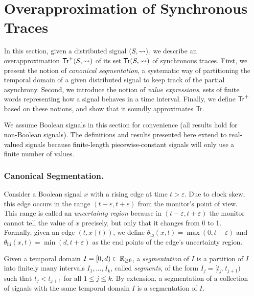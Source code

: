 \section{Overapproximation of Synchronous Traces} \label{sec:approach}
In this section, given a distributed signal $(S,{\rightsquigarrow})$, we describe an overapproximation $\mathsf{Tr}^+(S,{\rightsquigarrow})$ of its set $\mathsf{Tr}(S,{\rightsquigarrow})$ of synchronous traces.
First, we present the notion of \emph{canonical segmentation}, a systematic way of partitioning the temporal domain of a given distributed signal to keep track of the partial asynchrony.
Second, we introduce the notion of \emph{value expressions}, sets of finite words representing how a signal behaves in a time interval.
Finally, we define $\mathsf{Tr}^+$ based on these notions, and show that it soundly approximates $\mathsf{Tr}$.

\begin{remark}
	We assume Boolean signals in this section for convenience (all results hold for non-Boolean 
	signals).
	The definitions and results presented here extend to real-valued signals because finite-length piecewise-constant signals will only use a finite number of values.
\end{remark}

\subsubsection{Canonical Segmentation.}
Consider a Boolean signal $x$ with a rising edge at time $t > \varepsilon$.
Due to clock skew, this edge occurs in the range $(t - \varepsilon, t + \varepsilon)$ from the monitor's point of view.
This range is called an \emph{uncertainty region} because in $(t - \varepsilon, t + \varepsilon)$ the monitor cannot tell the value of $x$ precisely, but only that it changes from 0 to 1.
Formally, given an edge $(t, x(t))$, we define $\theta_{\text{lo}}(x,t) = \max(0, t - \varepsilon)$ and $\theta_{\text{hi}}(x,t) = \min(d, t + \varepsilon)$ as the end points of the edge's uncertainty region.

Given a temporal domain $I = [0,d) \subset \mathbb{R}_{\geq 0}$, a \emph{segmentation} of $I$ is a partition of $I$ into finitely many intervals $I_1, \ldots, I_k$, called \emph{segments}, of the form $I_j = [t_j, t_{j+1})$ such that $t_j < t_{j+1}$ for all $1 \leq j \leq k$.
By extension, a segmentation of a collection of signals with the same temporal domain $I$ is a segmentation of $I$.

